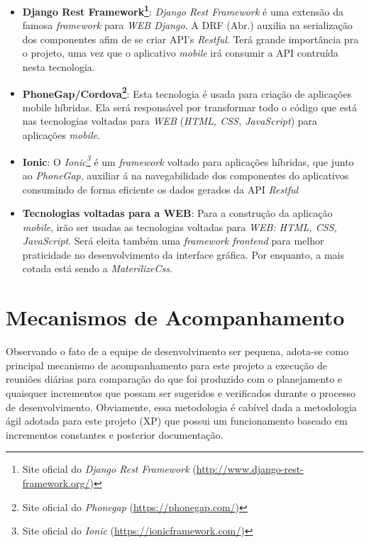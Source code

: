 \documentclass[
	article,			%
	11pt,				%
	oneside,			%
	a4paper,			%
	english,			%
	brazil,				%
	sumario=tradicional
	]{abntex2}
\begin{document}
\begin{itemize}
	\item \textbf{Django Rest Framework\footnote{Site oficial do  \textit{Django Rest Framework} (\href{http://www.django-rest-framework.org/}{http://www.django-rest-framework.org/})}}: \textit{Django Rest Framework} é uma extensão da famosa \textit{framework} para \textit{WEB Django}. A DRF (Abr.) auxilia na serialização dos componentes afim de se criar API’s \textit{Restful}. Terá grande importância pra o projeto, uma vez que o aplicativo \textit{mobile} irá consumir a API contruída nesta tecnologia.
	
	\item \textbf{PhoneGap/Cordova\footnote{Site oficial do \textit{Phonegap} (\href{https://phonegap.com/}{https://phonegap.com/})}}: Esta tecnologia é usada para criação de aplicações mobile híbridas. Ela será responsável por transformar todo o código que está nas tecnologias voltadas para \textit{WEB} (\textit{HTML, CSS, JavaScript}) para aplicações \textit{mobile}. 
	
	\item \textbf{Ionic}: O \textit{Ionic\footnote{Site oficial do \textit{Ionic} (\href{https://ionicframework.com/}{https://ionicframework.com/})}} é um \textit{framework} voltado para aplicações híbridas, que junto ao \textit{PhoneGap}, auxiliar á na navegabilidade dos componentes do aplicativos consumindo de forma eficiente os dados gerados da API \textit{Restful}
	
	\item \textbf{Tecnologias voltadas para a WEB}: Para a construção da aplicação \textit{mobile}, irão ser usadas as tecnologias voltadas para \textit{WEB: HTML, CSS, JavaScript}. Será eleita também uma \textit{framework frontend} para melhor praticidade no desenvolvimento da interface gráfica. Por enquanto, a mais cotada está sendo a \textit{MaterilizeCss}.
\end{itemize}

\section{Mecanismos de Acompanhamento}

Observando o fato de a equipe de desenvolvimento ser pequena, adota-se como principal mecanismo de acompanhamento para este projeto a execução de reuniões diárias para comparação do que foi produzido com o planejamento e quaisquer incrementos que possam ser sugeridos e verificados durante o processo de desenvolvimento. Obviamente, essa metodologia é cabível dada a metodologia ágil adotada para este projeto (XP) que possui um funcionamento baseado em incrementos constantes e posterior documentação.

\newpage

\end{document}
